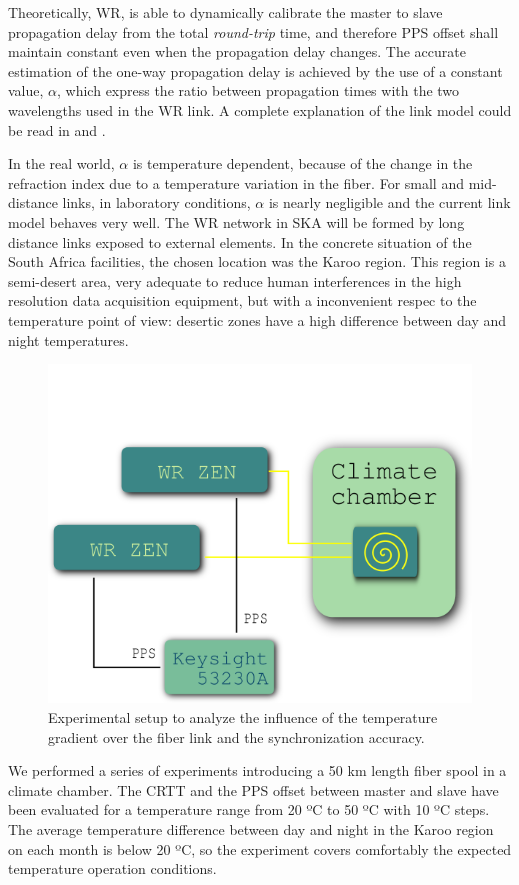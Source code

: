 Theoretically, WR, is able to dynamically calibrate the master to slave 
propagation delay from the total \textit{round-trip} time, and therefore PPS 
offset shall maintain constant even when the propagation delay changes. The 
accurate estimation of the one-way propagation delay is achieved by the use of 
a constant value, $\alpha$, which express the ratio between propagation times 
with the two wavelengths used in the WR link. A complete explanation of the 
link model could be read in \cite{Wlostowski2011} and \cite{Daniluk2012}.

In the real world, $\alpha$ is temperature dependent, because of the change in 
the refraction index due to a temperature variation in the fiber. For small and 
mid-distance links, in laboratory conditions, $\alpha$ is nearly negligible and 
the current link model behaves very well. The WR network in SKA will be formed 
by long distance links exposed to external elements. In the concrete situation 
of the South Africa facilities, the chosen location was the Karoo region. 
 This region is a 
semi-desert area, very adequate to reduce human interferences in the high 
resolution data acquisition equipment, but with a inconvenient respec to the 
temperature point of view: desertic zones have a high difference between day 
and night temperatures.

\begin{figure}
	\centering
	\includegraphics[width=0.7\linewidth]{img/tempsetup}
	\caption[Configuration of the climate chamber experiments]{Experimental 
		setup to analyze the influence of the temperature gradient over the 
		fiber 
		link and the synchronization accuracy.}
	\label{fig:tempsetup}
\end{figure}

We performed a series of experiments introducing a 50 km length fiber spool in 
a climate chamber. The CRTT and the PPS offset between master and slave have 
been evaluated for a temperature range from 20 ºC to 50 ºC with 10 ºC steps. 
The average temperature difference between day and night in the Karoo region on 
each month is below 20 ºC, so the experiment covers comfortably the expected 
temperature operation conditions.

